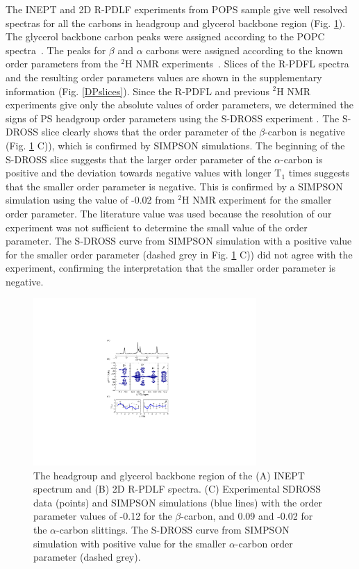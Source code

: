 \documentclass[aps,prl,superscriptaddress,twocolumn]{revtex4}
\begin{document}
The INEPT and 2D R-PDLF experiments from POPS sample give well resolved spectras for all the
carbons in headgroup and glycerol backbone region (Fig. \ref{PShgSIGNSsimpson}).
The glycerol backbone carbon peaks were assigned according to the POPC spectra~\cite{ferreira13}.
The peaks for $\beta$ and $\alpha$ carbons were assigned according to the
known order parameters from the $^2$H NMR experiments~\cite{browning80}.
Slices of the R-PDFL spectra and the resulting order parameters values
are shown in the supplementary information (Fig. \ref{DPslices}). 
Since the R-PDFL and previous $^2$H NMR experiments \cite{browning80,roux91} give 
only the absolute values of order parameters, we determined the signs of PS headgroup
order parameters using the S-DROSS experiment \cite{gross97}.
The S-DROSS slice clearly shows that the order parameter of
the $\beta$-carbon is negative (Fig. \ref{PShgSIGNSsimpson} C)),
which is confirmed by SIMPSON simulations. The beginning of the S-DROSS slice
suggests that the larger order parameter of the $\alpha$-carbon 
is positive and the deviation towards negative values with longer T$_1$ times suggests
that the smaller order parameter is negative. This is confirmed by a SIMPSON simulation
using the value of -0.02 from $^2$H NMR experiment \cite{roux91} for the smaller order parameter.
The literature value was used because the
resolution of our experiment was not sufficient to determine the
small value of the order parameter.
The S-DROSS curve from SIMPSON simulation with a positive value for the smaller order parameter
(dashed grey in Fig. \ref{PShgSIGNSsimpson} C)) did not agree with the experiment, 
confirming the interpretation that the smaller order parameter is negative.
\begin{figure}[!tb]
  \centering
  \includegraphics[width=8.5cm]{../Figs/fig1_POPS.pdf}
  \caption{\label{PShgSIGNSsimpson}
    The headgroup and glycerol backbone region of the (A) INEPT spectrum and
    (B) 2D R-PDLF spectra.
    (C) Experimental SDROSS data (points) and SIMPSON simulations (blue lines) with
    the order parameter values of -0.12 for the $\beta$-carbon, and 0.09 and -0.02
    for the $\alpha$-carbon slittings. The S-DROSS curve from SIMPSON simulation with positive value
    for the smaller $\alpha$-carbon order parameter (dashed grey).
  }
\end{figure}
\end{document}
